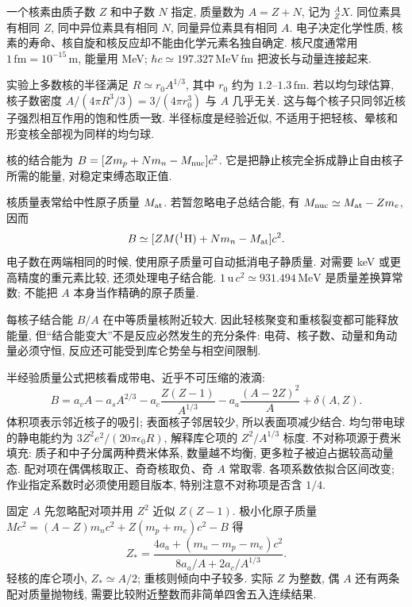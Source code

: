 \label{ch:nuclear-mass}
一个核素由质子数 $Z$ 和中子数 $N$ 指定, 质量数为 $A=Z+N$, 记为 ${}^{A}_{Z}X$. 同位素具有相同 $Z$, 同中异位素具有相同 $N$, 同量异位素具有相同 $A$. 电子决定化学性质, 核素的寿命、核自旋和核反应却不能由化学元素名独自确定. 核尺度通常用 $1\,\mathrm{fm}=10^{-15}\,\mathrm m$, 能量用 MeV; $\hbar c\simeq197.327\,\mathrm{MeV\,fm}$ 把波长与动量连接起来.

实验上多数核的半径满足 $R\simeq r_0A^{1/3}$, 其中 $r_0$ 约为 $1.2$--$1.3\,\mathrm{fm}$. 若以均匀球估算, 核子数密度 $A/(4\pi R^3/3)=3/(4\pi r_0^3)$ 与 $A$ 几乎无关. 这与每个核子只同邻近核子强烈相互作用的饱和性质一致. 半径标度是经验近似, 不适用于把轻核、晕核和形变核全部视为同样的均匀球.

\begin{definition}
核的结合能为 $B=[Zm_p+Nm_n-M_{\rm nuc}]c^2$. 它是把静止核完全拆成静止自由核子所需的能量, 对稳定束缚态取正值.
\end{definition}
核质量表常给中性原子质量 $M_{\rm at}$. 若暂忽略电子总结合能, 有 $M_{\rm nuc}\simeq M_{\rm at}-Zm_e$, 因而
\begin{equation}
 B\simeq[ZM({}^{1}\mathrm H)+Nm_n-M_{\rm at}]c^2.
\end{equation}
电子数在两端相同的时候, 使用原子质量可自动抵消电子静质量. 对需要 keV 或更高精度的重元素比较, 还须处理电子结合能. $1\,\mathrm u\,c^2\simeq931.494\,\mathrm{MeV}$ 是质量差换算常数; 不能把 $A$ 本身当作精确的原子质量.

每核子结合能 $B/A$ 在中等质量核附近较大. 因此轻核聚变和重核裂变都可能释放能量, 但``结合能变大''不是反应必然发生的充分条件: 电荷、核子数、动量和角动量必须守恒, 反应还可能受到库仑势垒与相空间限制.

半经验质量公式把核看成带电、近乎不可压缩的液滴:
\begin{equation}\label{eq:semf}
 B=a_vA-a_sA^{2/3}-a_c\frac{Z(Z-1)}{A^{1/3}}-a_a\frac{(A-2Z)^2}{A}+\delta(A,Z).
\end{equation}
体积项表示邻近核子的吸引; 表面核子邻居较少, 所以表面项减少结合. 均匀带电球的静电能约为 $3Z^2e^2/(20\pi\epsilon_0R)$, 解释库仑项的 $Z^2/A^{1/3}$ 标度. 不对称项源于费米填充: 质子和中子分属两种费米体系, 数量越不均衡, 更多粒子被迫占据较高动量态. 配对项在偶偶核取正、奇奇核取负、奇 $A$ 常取零. 各项系数依拟合区间改变; 作业指定系数时必须使用题目版本, 特别注意不对称项是否含 $1/4$.

固定 $A$ 先忽略配对项并用 $Z^2$ 近似 $Z(Z-1)$. 极小化原子质量
$M c^2=(A-Z)m_nc^2+Z(m_p+m_e)c^2-B$ 得
\begin{equation}
 Z_* =\frac{4a_a+(m_n-m_p-m_e)c^2}{8a_a/A+2a_c/A^{1/3}}.
\end{equation}
轻核的库仑项小, $Z_*\simeq A/2$; 重核则倾向中子较多. 实际 $Z$ 为整数, 偶 $A$ 还有两条配对质量抛物线, 需要比较附近整数而非简单四舍五入连续结果.

